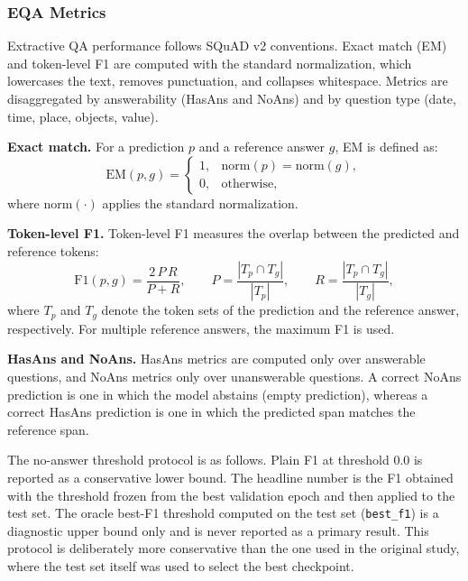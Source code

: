 \documentclass[graybox]{SNmult}
\begin{document}
\subsubsection{EQA Metrics}
\label{subsec:eqa-metrics}

Extractive QA performance follows SQuAD v2 conventions. Exact match (EM) and
token-level F1 are computed with the standard normalization, which lowercases
the text, removes punctuation, and collapses whitespace. Metrics are
disaggregated by answerability (HasAns and NoAns) and by question type (date,
time, place, objects, value).

\textbf{Exact match.} For a prediction $p$ and a reference answer $g$, EM is
defined as:
\begin{equation}
\mathrm{EM}(p,g) = \begin{cases}
1, & \mathrm{norm}(p) = \mathrm{norm}(g),\\
0, & \text{otherwise,}
\end{cases}
\label{eq:em}
\end{equation}
where $\mathrm{norm}(\cdot)$ applies the standard normalization.

\textbf{Token-level F1.} Token-level F1 measures the overlap between the
predicted and reference tokens:
\begin{equation}
\mathrm{F1}(p,g) = \frac{2\,P\,R}{P + R}, \qquad
P = \frac{|T_p \cap T_g|}{|T_p|}, \qquad
R = \frac{|T_p \cap T_g|}{|T_g|},
\label{eq:f1}
\end{equation}
where $T_p$ and $T_g$ denote the token sets of the prediction and the reference
answer, respectively. For multiple reference answers, the maximum F1 is used.

\textbf{HasAns and NoAns.} HasAns metrics are computed only over answerable
questions, and NoAns metrics only over unanswerable questions. A correct NoAns
prediction is one in which the model abstains (empty prediction), whereas a
correct HasAns prediction is one in which the predicted span matches the
reference span.

The no-answer threshold protocol is as follows. Plain F1 at threshold 0.0 is
reported as a conservative lower bound. The headline number is the F1 obtained
with the threshold frozen from the best validation epoch and then applied to
the test set. The oracle best-F1 threshold computed on the test set
(\texttt{best\_f1}) is a diagnostic upper bound only and is never reported as a
primary result. This protocol is deliberately more conservative than the one
used in the original study, where the test set itself was used to select the
best checkpoint.
\end{document}

